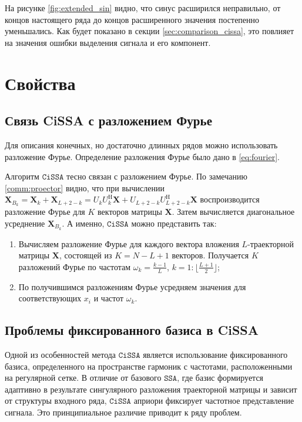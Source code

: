 \documentclass[12pt, specialist, subf
]{disser}
\theoremstyle{definition}
\newcommand{\SSA}{\texttt{SSA}}
\newcommand{\CISSA}{\texttt{CiSSA}}
\begin{document}
На рисунке \ref{fig:extended_sin} видно, что синус расширился неправильно, от концов настоящего ряда до концов расширенного значения постепенно уменьшались. Как будет показано в секции \ref{sec:comparison_cissa}, это повлияет на значения ошибки выделения сигнала и его компонент.




\section{Свойства}

\subsection{Связь CiSSA с разложением Фурье}
\label{subsec:cissa_fourier}
Для описания конечных, но достаточно длинных рядов можно использовать разложение Фурье. Определение разложения Фурье было дано в \eqref{eq:fourier}.

Алгоритм $\CISSA$ тесно связан с разложением Фурье. По замечанию \ref{comm:proector} видно, что при вычислении $\mathbf X_{B_k} = \mathbf X_k + \mathbf X_{L+2-k} = U_k U_k^\mathrm{H} \mathbf X + U_{L+2-k} U_{L+2-k}^\mathrm{H} \mathbf X$  воспроизводится разложение Фурье для $K$ векторов матрицы $\mathbf{X}$. Затем вычисляется диагональное усреднение $\mathbf X_{B_k}$. А именно, $\CISSA$ можно представить так:
\begin{enumerate}
	\item Вычисляем разложение Фурье для каждого вектора вложения $L$-траекторной матрицы $\mathbf{X}$, состоящей из $K = N - L + 1$ векторов. Получается $K$ разложений Фурье по частотам $\omega_k = \frac{k-1}{L}$, $k = 1:\lfloor \frac{L+1}{2} \rfloor$;
	\item По получившимся разложениям Фурье усредняем значения для соответствующих $x_i$ и частот $\omega_k$.
\end{enumerate}


\subsection{Проблемы фиксированного базиса в CiSSA}
\label{subsec:cissa_fixed_basis_problems}

Одной из особенностей метода $\CISSA$ является использование фиксированного базиса, определенного на пространстве гармоник с частотами, расположенными на регулярной сетке. В отличие от базового $\SSA$, где базис формируется адаптивно в результате сингулярного разложения траекторной матрицы и зависит от структуры входного ряда, $\CISSA$ априори фиксирует частотное представление сигнала. Это принципиальное различие приводит к ряду проблем.
\end{document}
